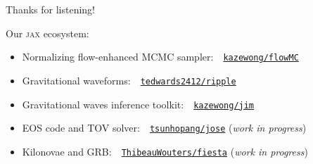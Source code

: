 \documentclass[usenames,dvipsnames,t]{beamer}
\begin{document}
\begin{frame}{Thanks for listening!}

  \def\x{4mm}
  \def\y{3mm}
  
  Our \textsc{jax} ecosystem:
  \vspace{\x}
  \begin{itemize}
    \item Normalizing flow-enhanced MCMC sampler:\small~\faGithub~\href{https://github.com/kazewong/flowMC}{\texttt{kazewong/flowMC}} \normalsize
    
    \vspace{\x}
  
    \item Gravitational waveforms:~\small \faGithub~\href{https://github.com/tedwards2412/ripple}{\texttt{tedwards2412/ripple}} \normalsize
    
    \vspace{\x}
    
    \item Gravitational waves inference toolkit:~\small \faGithub~\href{https://github.com/kazewong/jim}{\texttt{kazewong/jim}} \normalsize
  
    \vspace{\x}
  
    \item EOS code and TOV solver:~\small \faGithub~\href{https://github.com/tsunhopang/jose}{\texttt{tsunhopang/jose}} (\textit{work in progress}) \normalsize
  
    \vspace{\x}
  
    \item Kilonovae and GRB:~\small \faGithub~\href{https://github.com/ThibeauWouters/fiesta}{\texttt{ThibeauWouters/fiesta}} (\textit{work in progress}) \normalsize
  \end{itemize}

\end{frame}
  
\end{document}
